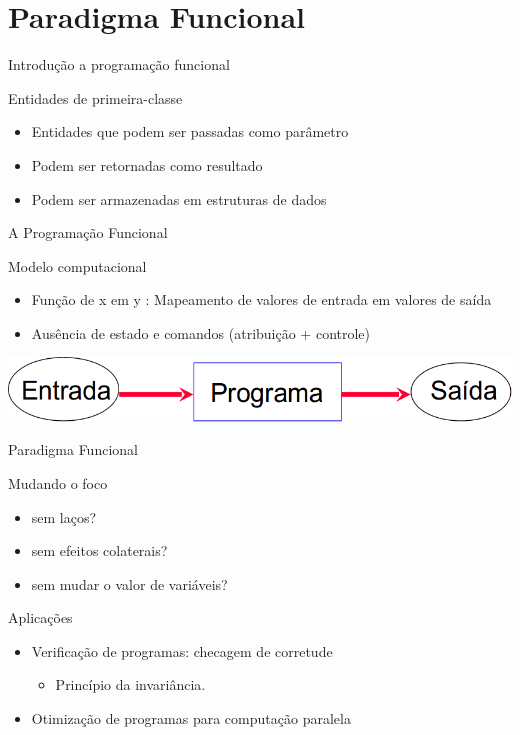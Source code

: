 \section{Paradigma Funcional}
\begin{frame}{Introdução a programação funcional}
	\begin{block}{Entidades de primeira-classe}
	\begin{itemize}
		\item Entidades que podem ser passadas como parâmetro
		\item Podem ser retornadas como resultado
		\item Podem ser armazenadas em estruturas de dados
	\end{itemize}
	\end{block}
\end{frame}
\begin{frame}{A Programação Funcional}
	\begin{block}{Modelo computacional}
		\begin{itemize}
			\item Função de x em y : Mapeamento de valores de entrada em valores de saída
			\item Ausência de estado e comandos (atribuição + controle)
		\end{itemize}		
	\end{block}
	\begin{center}
		\includegraphics[scale=0.3]{paradigma_funcional/modelo_funcional.png}
	\end{center}
\end{frame}
\begin{frame}{Paradigma Funcional}
	\begin{block}{Mudando o foco}
		\begin{itemize}
			\item sem laços?
			\item sem efeitos colaterais?
			\item sem mudar o valor de variáveis?
		\end{itemize}
	\end{block}
	\begin{block}{Aplicações}
		\begin{itemize}
			\item Verificação de programas: checagem de corretude 
				\begin{itemize}
					\item Princípio da invariância.
				\end{itemize}
			\item Otimização de programas para computação paralela
		\end{itemize}
	\end{block}
\end{frame}
